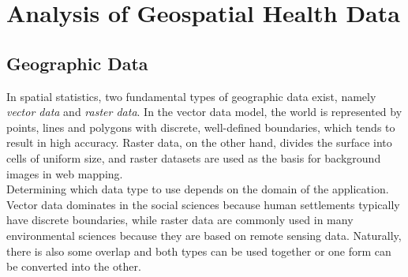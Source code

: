 %

\chapter{Analysis of Geospatial Health Data}
\label{sec:geodata}
\section{Geographic Data}
In spatial statistics, two fundamental types of geographic data exist, namely \textit{vector data} and \textit{raster data}. In the vector data model, the world is represented by points, lines and polygons with discrete, well-defined boundaries, which tends to result in high accuracy. Raster data, on the other hand, divides the surface into cells of uniform size, and raster datasets are used as the basis for background images in web mapping. \\
Determining which data type to use depends on the domain of the application. Vector data dominates in the social sciences because human settlements typically have discrete boundaries, while raster data are commonly used in many environmental sciences because they are based on remote sensing data. Naturally, there is also some overlap and both types can be used together or one form can be converted into the other.
